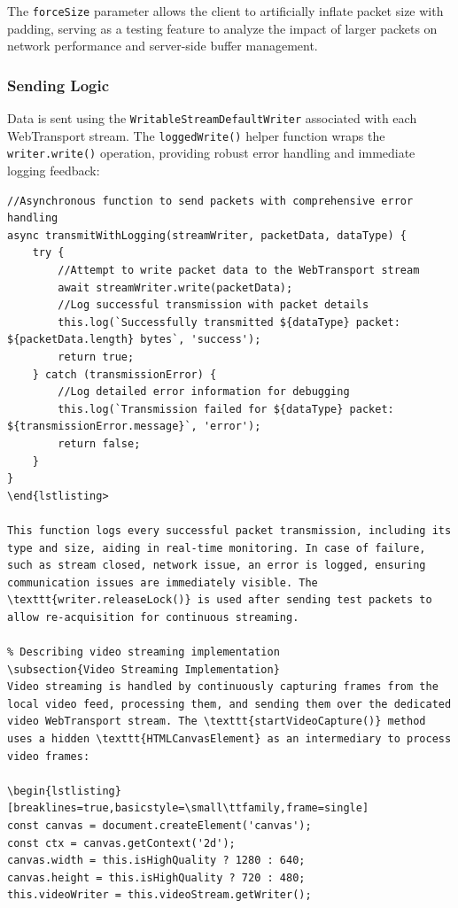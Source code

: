 The \texttt{forceSize} parameter allows the client to artificially inflate packet size with padding, serving as a testing feature to analyze the impact of larger packets on network performance and server-side buffer management.

\subsubsection{Sending Logic}
Data is sent using the \texttt{WritableStreamDefaultWriter} associated with each WebTransport stream. The \texttt{loggedWrite()} helper function wraps the \texttt{writer.write()} operation, providing robust error handling and immediate logging feedback:

\begin{lstlisting}[breaklines=true,basicstyle=\small\ttfamily,frame=single]
//Asynchronous function to send packets with comprehensive error handling
async transmitWithLogging(streamWriter, packetData, dataType) {
    try {
        //Attempt to write packet data to the WebTransport stream
        await streamWriter.write(packetData);
        //Log successful transmission with packet details
        this.log(`Successfully transmitted ${dataType} packet: ${packetData.length} bytes`, 'success');
        return true;
    } catch (transmissionError) {
        //Log detailed error information for debugging
        this.log(`Transmission failed for ${dataType} packet: ${transmissionError.message}`, 'error');
        return false;
    }
}
\end{lstlisting>

This function logs every successful packet transmission, including its type and size, aiding in real-time monitoring. In case of failure, such as stream closed, network issue, an error is logged, ensuring communication issues are immediately visible. The \texttt{writer.releaseLock()} is used after sending test packets to allow re-acquisition for continuous streaming.

% Describing video streaming implementation
\subsection{Video Streaming Implementation}
Video streaming is handled by continuously capturing frames from the local video feed, processing them, and sending them over the dedicated video WebTransport stream. The \texttt{startVideoCapture()} method uses a hidden \texttt{HTMLCanvasElement} as an intermediary to process video frames:

\begin{lstlisting}[breaklines=true,basicstyle=\small\ttfamily,frame=single]
const canvas = document.createElement('canvas');
const ctx = canvas.getContext('2d');
canvas.width = this.isHighQuality ? 1280 : 640;
canvas.height = this.isHighQuality ? 720 : 480;
this.videoWriter = this.videoStream.getWriter();
\end{lstlisting}

